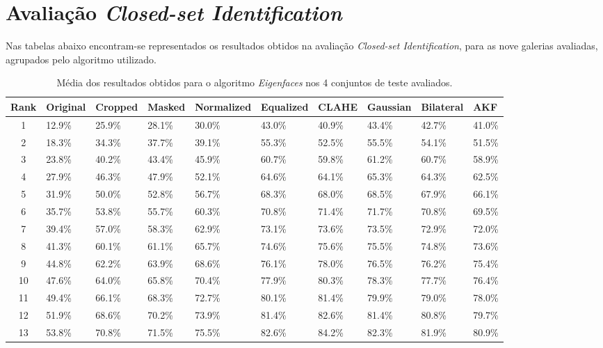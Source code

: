 \chapter{Avaliação \textit{Closed-set Identification}} \label{ap1:closed-set}
Nas tabelas abaixo encontram-se representados os resultados obtidos na avaliação \textit{Closed-set Identification}, para as nove galerias avaliadas, agrupados pelo algoritmo utilizado.

\begin{table}[h]
    \begin{center}
    \caption{Média dos resultados obtidos para o algoritmo \textit{Eigenfaces} nos 4 conjuntos de teste avaliados.}	
	\begin{tabular}{c|p{1.2cm}p{1.1cm}p{1.1cm}p{1.7cm}p{1.5cm}p{1.2cm}p{1.2cm}p{1.2cm}p{1.2cm}}
	Rank & Original & Cropped & Masked & Normalized & Equalized & CLAHE & Gaussian & Bilateral & AKF \\ 
	\hline\hline
	1 & 12.9\% & 25.9\% & 28.1\% & 30.0\% & 43.0\% & 40.9\% & 43.4\% & 42.7\% & 41.0\% \\ 
	2 & 18.3\% & 34.3\% & 37.7\% & 39.1\% & 55.3\% & 52.5\% & 55.5\% & 54.1\% & 51.5\% \\ 
	3 & 23.8\% & 40.2\% & 43.4\% & 45.9\% & 60.7\% & 59.8\% & 61.2\% & 60.7\% & 58.9\% \\ 
	4 & 27.9\% & 46.3\% & 47.9\% & 52.1\% & 64.6\% & 64.1\% & 65.3\% & 64.3\% & 62.5\% \\ 
	5 & 31.9\% & 50.0\% & 52.8\% & 56.7\% & 68.3\% & 68.0\% & 68.5\% & 67.9\% & 66.1\% \\ 
	6 & 35.7\% & 53.8\% & 55.7\% & 60.3\% & 70.8\% & 71.4\% & 71.7\% & 70.8\% & 69.5\% \\ 
	7 & 39.4\% & 57.0\% & 58.3\% & 62.9\% & 73.1\% & 73.6\% & 73.5\% & 72.9\% & 72.0\% \\ 
	8 & 41.3\% & 60.1\% & 61.1\% & 65.7\% & 74.6\% & 75.6\% & 75.5\% & 74.8\% & 73.6\% \\ 
	9 & 44.8\% & 62.2\% & 63.9\% & 68.6\% & 76.1\% & 78.0\% & 76.5\% & 76.2\% & 75.4\% \\ 
	10 & 47.6\% & 64.0\% & 65.8\% & 70.4\% & 77.9\% & 80.3\% & 78.3\% & 77.7\% & 76.4\% \\ 
	11 & 49.4\% & 66.1\% & 68.3\% & 72.7\% & 80.1\% & 81.4\% & 79.9\% & 79.0\% & 78.0\% \\ 
	12 & 51.9\% & 68.6\% & 70.2\% & 73.9\% & 81.4\% & 82.6\% & 81.4\% & 80.8\% & 79.7\% \\ 
	13 & 53.8\% & 70.8\% & 71.5\% & 75.5\% & 82.6\% & 84.2\% & 82.3\% & 81.9\% & 80.9\% \\ 

\end{tabular}
\end{center}
\end{table}
